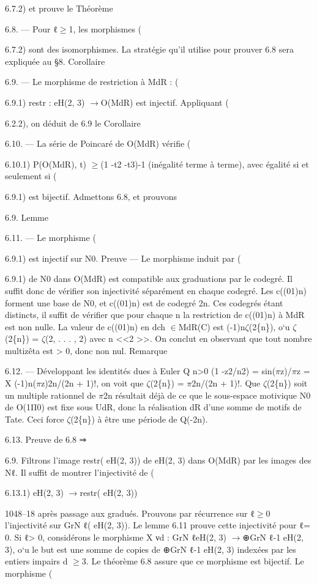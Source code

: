 \documentclass[11pt]{article}
\begin{document}
6.7.2) et prouve le Théorème 

6.8. --- Pour ℓ\(\ge\)1, les morphismes (

6.7.2) sont des isomorphismes. La stratégie qu’il utilise pour prouver 6.8 sera expliquée au §8. Corollaire 

6.9. --- Le morphisme de restriction à MdR : (

6.9.1) restr : eH(2, 3) \(\to\)O(MdR) est injectif. Appliquant (

6.2.2), on déduit de 6.9 le Corollaire 

6.10. --- La série de Poincaré de O(MdR) vérifie (

6.10.1) P(O(MdR), t) \(\ge\)(1 -t2 -t3)-1 (inégalité terme à terme), avec égalité si et seulement si (

6.9.1) est bijectif. Admettons 6.8, et prouvons 

6.9. Lemme 

6.11. --- Le morphisme (

6.9.1) est injectif sur N0. Preuve --- Le morphisme induit par (

6.9.1) de N0 dans O(MdR) est compatible aux graduations par le codegré. Il suffit donc de vérifier son injectivité séparément en chaque codegré. Les c((01)n) forment une base de N0, et c((01)n) est de codegré 2n. Ces codegrés étant distincts, il suffit de vérifier que pour chaque n la restriction de c((01)n) à MdR est non nulle. La valeur de c((01)n) en dch \(\in\)MdR(C) est (-1)n\(\zeta\)(2\{n\}), o`u \(\zeta\)(2\{n\}) = \(\zeta\)(2, . . . , 2) avec n <<2 >>. On conclut en observant que tout nombre multizêta est > 0, donc non nul. Remarque 

6.12. --- Développant les identités dues à Euler Q n>0 (1 -z2/n2) = sin(\(\pi\)z)/\(\pi\)z = X (-1)n(\(\pi\)z)2n/(2n + 1)!, on voit que \(\zeta\)(2\{n\}) = \(\pi\)2n/(2n + 1)!. Que \(\zeta\)(2\{n\}) soit un multiple rationnel de \(\pi\)2n résultait déjà de ce que le sous-espace motivique N0 de O(1Π0) est fixe sous UdR, donc la réalisation dR d’une somme de motifs de Tate. Ceci force \(\zeta\)(2\{n\}) à être une période de Q(-2n). 

6.13. Preuve de 6.8 ⇒

6.9. Filtrons l’image restr( eH(2, 3)) de eH(2, 3) dans O(MdR) par les images des Nℓ. Il suffit de montrer l’injectivité de (

6.13.1) eH(2, 3) \(\to\)restr( eH(2, 3))

1048--18 après passage aux gradués. Prouvons par récurrence sur ℓ\(\ge\)0 l’injectivité sur GrN ℓ( eH(2, 3)). Le lemme 6.11 prouve cette injectivité pour ℓ= 0. Si ℓ> 0, considérons le morphisme X νd : GrN ℓeH(2, 3) \(\to\)⊕GrN ℓ-1 eH(2, 3), o`u le but est une somme de copies de ⊕GrN ℓ-1 eH(2, 3) indexées par les entiers impairs d \(\ge\)3. Le théorème 6.8 assure que ce morphisme est bijectif. Le morphisme (
\end{document}
